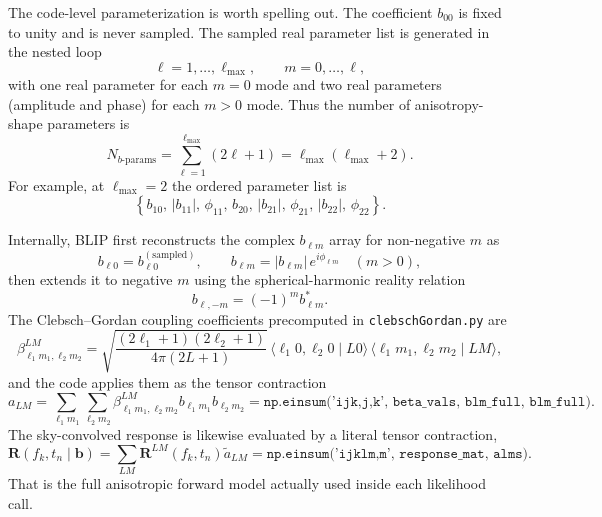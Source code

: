 \documentclass[11pt]{article}
\begin{document}
The code-level parameterization is worth spelling out. The coefficient $b_{00}$ is fixed to unity and is never sampled. The sampled real parameter list is generated in the nested loop
\begin{equation}
\ell=1,\dots,\ell_{\max},
\qquad
m=0,\dots,\ell,
\end{equation}
with one real parameter for each $m=0$ mode and two real parameters (amplitude and phase) for each $m>0$ mode. Thus the number of anisotropy-shape parameters is
\begin{equation}
N_{b\text{-params}}
=\sum_{\ell=1}^{\ell_{\max}} (2\ell+1)
=\ell_{\max}(\ell_{\max}+2).
\end{equation}
For example, at $\ell_{\max}=2$ the ordered parameter list is
\begin{equation}
\left\{
b_{10},\,|b_{11}|,\,\phi_{11},\,b_{20},\,|b_{21}|,\,\phi_{21},\,|b_{22}|,\,\phi_{22}
\right\}.
\end{equation}

Internally, BLIP first reconstructs the complex $b_{\ell m}$ array for non-negative $m$ as
\begin{equation}
b_{\ell 0}=b_{\ell 0}^{\mathrm{(sampled)}},
\qquad
b_{\ell m}=|b_{\ell m}|\,e^{i\phi_{\ell m}}
\quad (m>0),
\end{equation}
then extends it to negative $m$ using the spherical-harmonic reality relation
\begin{equation}
b_{\ell,-m}=(-1)^m b_{\ell m}^{\ast}.
\end{equation}
The Clebsch--Gordan coupling coefficients precomputed in \texttt{clebschGordan.py} are
\begin{equation}
\beta^{LM}_{\ell_1 m_1,\ell_2 m_2}
=\sqrt{\frac{(2\ell_1+1)(2\ell_2+1)}{4\pi(2L+1)}}
\,
\langle \ell_1 0,\ell_2 0 \mid L0\rangle
\,
\langle \ell_1 m_1,\ell_2 m_2 \mid LM\rangle,
\end{equation}
and the code applies them as the tensor contraction
\begin{equation}
a_{LM}
=\sum_{\ell_1 m_1}\sum_{\ell_2 m_2}
\beta^{LM}_{\ell_1 m_1,\ell_2 m_2}
b_{\ell_1 m_1}b_{\ell_2 m_2}
=\texttt{np.einsum('ijk,j,k', beta\_vals, blm\_full, blm\_full)}.
\end{equation}
The sky-convolved response is likewise evaluated by a literal tensor contraction,
\begin{equation}
\mathbf{R}(f_k,t_n\mid\bm{b})
=\sum_{LM}\mathbf{R}^{LM}(f_k,t_n)\tilde{a}_{LM}
=\texttt{np.einsum('ijklm,m', response\_mat, alms)}.
\end{equation}
That is the full anisotropic forward model actually used inside each likelihood call.
\end{document}
